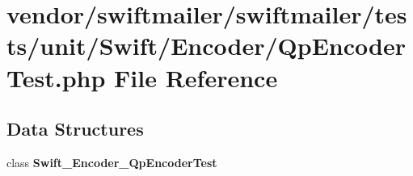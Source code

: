 \section{vendor/swiftmailer/swiftmailer/tests/unit/\+Swift/\+Encoder/\+Qp\+Encoder\+Test.php File Reference}
\label{_qp_encoder_test_8php}
\subsection*{Data Structures}
\begin{DoxyCompactItemize}
\item 
class {\bf Swift\+\_\+\+Encoder\+\_\+\+Qp\+Encoder\+Test}
\end{DoxyCompactItemize}
